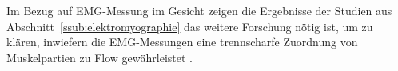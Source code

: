 Im Bezug auf \ac{EMG}-Messung im Gesicht zeigen die Ergebnisse der Studien aus Abschnitt~\ref{ssub:elektromyographie} das weitere Forschung nötig ist, um zu klären, inwiefern die \ac{EMG}-Messungen eine trennscharfe Zuordnung von Muskelpartien zu Flow gewährleistet \citep{Peifer2012}.

